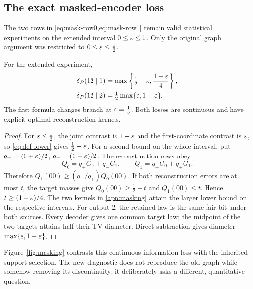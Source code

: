\subsection{The exact masked-encoder loss}
The two rows in \cref{eq:mask-row0,eq:mask-row1} remain valid statistical experiments on the extended interval \(0\le\varepsilon\le1\). Only the original graph argument was restricted to \(0\le\varepsilon\le\tfrac12\).
\begin{theorem}\label{p2-08}
For the extended experiment,
\begin{align}
 \delta_P(12\mid1)&=\max\left\{\tfrac12-\varepsilon,\frac{1-\varepsilon}{4}\right\},\label{eq:masked-def1}\\
 \delta_P(12\mid2)&=\tfrac12\max\{\varepsilon,1-\varepsilon\}.\label{eq:masked-def2}
\end{align}
The first formula changes branch at \(\varepsilon=\tfrac13\). Both losses are continuous and have explicit optimal reconstruction kernels.
\end{theorem}
\begin{proof}
For \(\varepsilon\le\tfrac12\), the joint contrast is \(1-\varepsilon\) and the first-coordinate contrast is \(\varepsilon\), so \cref{eq:def-lower} gives \(\tfrac12-\varepsilon\). For a second bound on the whole interval, put \(q_+=(1+\varepsilon)/2\), \(q_-=(1-\varepsilon)/2\). The reconstruction rows obey
\[
 Q_0=q_+G_0+q_-G_1,\qquad Q_1=q_-G_0+q_+G_1.
\]
Therefore \(Q_1(00)\ge(q_-/q_+)Q_0(00)\). If both reconstruction errors are at most \(t\), the target masses give \(Q_0(00)\ge\tfrac12-t\) and \(Q_1(00)\le t\). Hence \(t\ge(1-\varepsilon)/4\). The two kernels in \cref{app:masking} attain the larger lower bound on the respective intervals. For output 2, the retained law is the same fair bit under both sources. Every decoder gives one common target law; the midpoint of the two targets attains half their TV diameter. Direct subtraction gives diameter \(\max\{\varepsilon,1-\varepsilon\}\).
\end{proof}
Figure~\ref{fig:masking} contrasts this continuous information loss with the inherited support selection. The new diagnostic does not reproduce the old graph while somehow removing its discontinuity: it deliberately asks a different, quantitative question.
